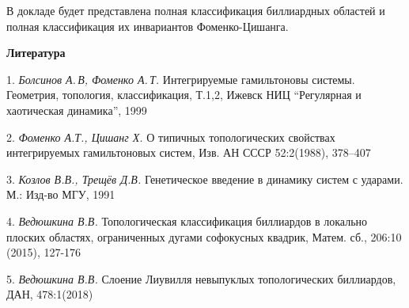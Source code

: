  В докладе будет представлена полная классификация биллиардных областей и полная классификация их инвариантов Фоменко-Цишанга.



\smallskip \centerline{\bf Литература}\nopagebreak



1. {\it Болсинов А.\,В, Фоменко А.\,Т.} Интегрируемые гамильтоновы системы.
Геометрия, топология, классификация,
\linebreak
Т.1,2,
   Ижевск
   НИЦ ``Регулярная и хаотическая динамика'',
  1999

2. {\it  Фоменко А.Т., Цишанг Х.} О типичных топологических свойствах
интегрируемых гамильтоновых систем,  Изв. АН СССР
   52:2(1988),
  378--407


  3. {\it Козлов В.В., Трещёв Д.В.} Генетическое  введение в динамику систем с ударами. М.: Изд-во МГУ, 1991

4.  {\it Ведюшкина В.В.} Топологическая классификация биллиардов в локально плоских областях,
ограниченных дугами софокусных квадрик, Матем. сб., 206:10 (2015), 127-176

  5. {\it Ведюшкина В.В.} Слоение Лиувилля невыпуклых топологических биллиардов, ДАН, 478:1(2018)

